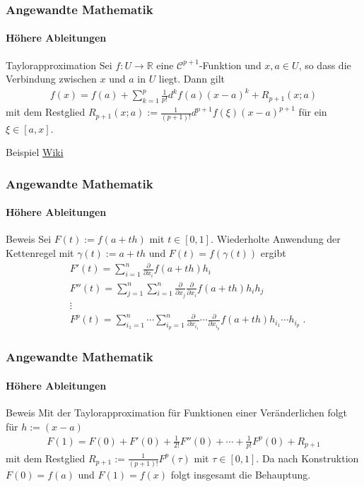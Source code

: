 \documentclass{beamer}
\begin{document}
\begin{frame}
    \frametitle{Angewandte Mathematik}
\framesubtitle{Höhere Ableitungen}
    \begin{block}{Taylorapproximation}
Sei   $f: U \to \mathbb{R}$ eine $\mathcal{C}^{p+1}$-Funktion und $x,a \in U$, so dass die Verbindung zwischen $x$ und $a$ in $U$ liegt.
Dann gilt
\begin{align*}
f(x) = f(a) + \sum_{k=1}^{p}\frac{1}{p!} d^k f(a) (x-a)^k + R_{p+1} (x;a)
\end{align*}
mit dem Restglied $R_{p+1} (x;a) := \frac{1}{(p+1)!} d^{p+1}f(\xi) (x-a)^{p+1}$ für ein $\xi \in [a,x]$.

\end{block}
\begin{block}{Beispiel}
\href{https://de.wikipedia.org/wiki/Taylor-Formel\#Taylor-Formel_im_Mehrdimensionalen}{Wiki}
\end{block}
 \end{frame}


\begin{frame}
    \frametitle{Angewandte Mathematik}
\framesubtitle{Höhere Ableitungen}
    \begin{block}{Beweis}
Sei $F(t) := f(a + th)$ mit $t \in [0,1]$. Wiederholte Anwendung der Kettenregel mit $\gamma(t) := a +th$ und $F(t) = f(\gamma(t))$ ergibt
\begin{align*}
& F'(t) = \sum_{i=1}^n  \frac{\partial}{\partial x_{i}} f(a + th) h_i \\
& F''(t) =\sum_{j=1}^n \sum_{i=1}^n   \frac{\partial}{\partial x_{j}} \frac{\partial}{\partial x_{i}} f(a + th) h_i h_j \\
& \vdots \\
& F^p(t) =  \sum_{i_1=1}^n  \cdots \sum_{i_p=1}^n   \frac{\partial}{\partial x_{i_1}} \cdots \frac{\partial}{\partial x_{i_p}} f(a + th) h_{i_1} \cdots  h_{i_p}  \; .
\end{align*}
\end{block}
 \end{frame}

\begin{frame}
    \frametitle{Angewandte Mathematik}
\framesubtitle{Höhere Ableitungen}
    \begin{block}{Beweis}
Mit der Taylorapproximation für Funktionen einer Veränderlichen  folgt für $h := (x-a)$ 
\begin{align*}
 F(1) = F(0) + F'(0) + \frac{1}{2!} F''(0) + \cdots + \frac{1}{p!} F^p(0) + R_{p+1} 
\end{align*}
mit dem Restglied $ R_{p+1}  :=  \frac{1}{(p+1)!}  F^p(\tau)$ mit $\tau \in [0,1]$.
Da nach Konstruktion $F(0) = f(a)$ und $F(1)= f(x)$ folgt insgesamt die Behauptung.
\end{block}
 \end{frame}
\end{document}
